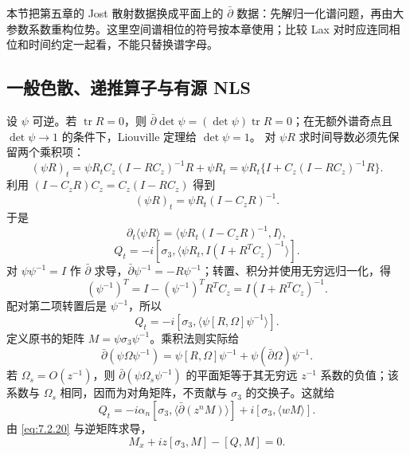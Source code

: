 \documentclass[lang=cn,scheme=chinese,mode=simple,device=normal,color=blue,math=cm,thmcnt=section,12pt]{elegantbook}
\newcommand{\eqq}[2]{\tag{#1}\label{eq:#1}#2}
\begin{document}
\begin{remark}[与第五章的联系]
本节把第五章的 Jost 散射数据换成平面上的 $\bar\partial$ 数据：先解归一化谱问题，再由大参数系数重构位势。这里空间谱相位的符号按本章使用；比较 Lax 对时应连同相位和时间约定一起看，不能只替换谱字母。
\end{remark}

\subsection{一般色散、递推算子与有源 NLS}
设 $\psi$ 可逆。若 $\operatorname{tr}R=0$，则 $\bar\partial\det\psi=(\det\psi)\operatorname{tr}R=0$；在无额外谱奇点且 $\det\psi\to1$ 的条件下，Liouville 定理给 $\det\psi=1$。
对 $\psi R$ 求时间导数必须先保留两个乘积项：
\[
(\psi R)_t=\psi R_tC_z(I-RC_z)^{-1}R+\psi R_t
=\psi R_t\{I+C_z(I-RC_z)^{-1}R\}.
\]
利用 $(I-C_zR)C_z=C_z(I-RC_z)$ 得到
\begin{equation}
\eqq{7.2.31}{(\psi R)_t=\psi R_t(I-C_zR)^{-1}.}
\end{equation}
于是
\begin{equation}
\eqq{7.2.32}{\partial_t\langle\psi R\rangle=\langle\psi R_t(I-C_zR)^{-1},I\rangle,}
\end{equation}
\begin{equation}
\eqq{7.2.33}{Q_t=-i[\sigma_3,\langle\psi R_t,I(I+R^TC_z)^{-1}\rangle].}
\end{equation}
对 $\psi\psi^{-1}=I$ 作 $\bar\partial$ 求导，$\bar\partial\psi^{-1}=-R\psi^{-1}$；转置、积分并使用无穷远归一化，得
\begin{equation}
\eqq{7.2.34}{(\psi^{-1})^T=I-(\psi^{-1})^TR^TC_z=I(I+R^TC_z)^{-1}.}
\end{equation}
配对第二项转置后是 $\psi^{-1}$，所以
\begin{equation}
\eqq{7.2.35}{Q_t=-i[\sigma_3,\langle\psi[R,\Omega]\psi^{-1}\rangle].}
\end{equation}
定义原书的矩阵 $M=\psi\sigma_3\psi^{-1}$。乘积法则实际给
\[
\bar\partial(\psi\Omega\psi^{-1})
=\psi[R,\Omega]\psi^{-1}+\psi(\bar\partial\Omega)\psi^{-1}.
\]
若 $\Omega_s=O(z^{-1})$，则 $\bar\partial(\psi\Omega_s\psi^{-1})$ 的平面矩等于其无穷远 $z^{-1}$ 系数的负值；该系数与 $\Omega_s$ 相同，因而为对角矩阵，不贡献与 $\sigma_3$ 的交换子。这就给
\begin{equation}
\eqq{7.2.36}{Q_t=-i\alpha_n[\sigma_3,\langle\bar\partial(z^nM)\rangle]
+i[\sigma_3,\langle wM\rangle].}
\end{equation}
由 \eqref{eq:7.2.20} 与逆矩阵求导，
\begin{equation}
\eqq{7.2.37}{M_x+iz[\sigma_3,M]-[Q,M]=0.}
\end{equation}
\end{document}
